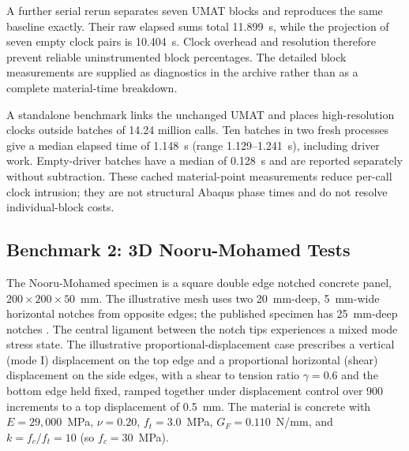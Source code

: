 \documentclass[preprint,11pt,a4paper]{elsarticle}
\begin{document}
A further serial rerun separates seven UMAT blocks and reproduces the same baseline exactly. Their raw elapsed sums total 11.899~s, while the projection of seven empty clock pairs is 10.404~s. Clock overhead and resolution therefore prevent reliable uninstrumented block percentages. The detailed block measurements are supplied as diagnostics in the archive rather than as a complete material-time breakdown.

A standalone benchmark links the unchanged UMAT and places high-resolution clocks outside batches of 14.24 million calls. Ten batches in two fresh processes give a median elapsed time of 1.148~s (range 1.129--1.241~s), including driver work. Empty-driver batches have a median of 0.128~s and are reported separately without subtraction. These cached material-point measurements reduce per-call clock intrusion; they are not structural Abaqus phase times and do not resolve individual-block costs.





\subsection{Benchmark 2: 3D Nooru-Mohamed Tests}

The Nooru-Mohamed specimen is a square double edge notched concrete
panel, $200 \times 200 \times 50$~mm. The illustrative mesh uses two
20~mm-deep, 5~mm-wide horizontal notches from opposite edges; the published
specimen has 25~mm-deep notches \citep{nooru1992}. The
central ligament between the notch tips experiences a mixed
mode stress state. The illustrative proportional-displacement case prescribes a vertical (mode I)
displacement on the top edge and a proportional horizontal
(shear) displacement on the side edges, with a shear to tension ratio
$\gamma = 0.6$ and the bottom edge held fixed, ramped together under
displacement control over 900 increments to a top displacement of
0.5~mm. The material is concrete with $E = 29{,}000$~MPa, $\nu = 0.20$,
$f_t = 3.0$~MPa, $G_F = 0.110$~N/mm, and $k = f_c/f_t = 10$ (so
$f_c = 30$~MPa).
\end{document}
